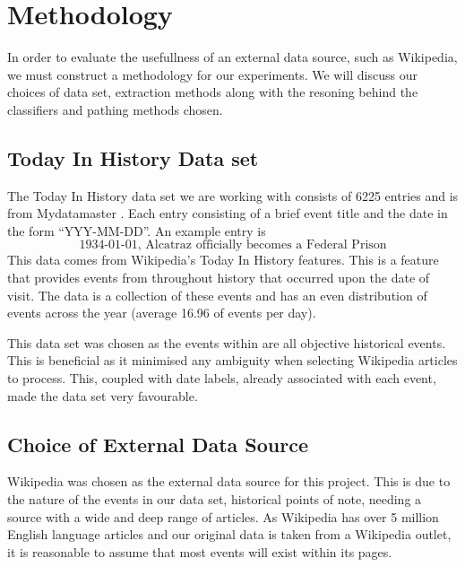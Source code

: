 \documentclass[bsc,frontabs,twoside,singlespacing,parskip,deptreport]{infthesis}     %
\begin{document}
\chapter{Methodology}
In order to evaluate the usefullness of an external data source, such as Wikipedia, we must construct a methodology
for our experiments. We will discuss our choices of data set, extraction methods along with the resoning behind the
classifiers and pathing methods chosen.


\section{Today In History Data set}
The Today In History data set we are working with consists of 6225 entries and is from Mydatamaster \cite{mydatamaster}.
Each entry consisting of a  brief event title and the date in the form ``YYY-MM-DD''.
An example entry is
\begin{equation}
  \text{1934-01-01, Alcatraz officially becomes a Federal Prison}\nonumber
\end{equation}
This data comes from Wikipedia's Today In History features. This is a feature that provides events from
throughout history that occurred upon the date of visit. The data is a collection of these events and has
an even distribution of events across the year (average 16.96 of events per day).


This data set was chosen as the events within are all objective historical events. This is beneficial as it minimised
any ambiguity when selecting Wikipedia articles to process. This, coupled with date labels, already associated with
each event, made the data set very favourable.


\section{Choice of External Data Source}
Wikipedia was chosen as the external data source for this project.
This is due to the nature of the events in our data set, historical points of note,
needing a source with a wide and deep range of articles.
As Wikipedia has over 5 million English language articles \cite{wikipedaisize} and our original data
is taken from a Wikipedia outlet, it is reasonable to assume
that most events will exist within its pages.
\end{document}
